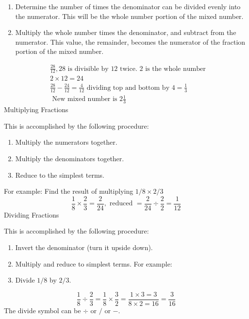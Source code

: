 \documentclass[10pt]{article}
\begin{document}
\begin{enumerate}
  \item Determine the number of times the denominator can be divided evenly into the numerator. This will be the whole number portion of the mixed number.

  \item Multiply the whole number times the denominator, and subtract from the numerator. This value, the remainder, becomes the numerator of the fraction portion of the mixed number.

\end{enumerate}
$$
\begin{aligned}
&\frac{28}{12}, 28 \text { is divisible by } 12 \text { twice. } 2 \text { is the whole number } \\
&2 \times 12=24 \\
&\frac{28}{12}-\frac{24}{12}=\frac{4}{12} \text { dividing top and bottom by } 4=\frac{1}{3} \\
&\text { New mixed number is } 2 \frac{1}{3}
\end{aligned}
$$
Multiplying Fractions

This is accomplished by the following procedure:

\begin{enumerate}
  \item Multiply the numerators together.

  \item Multiply the denominators together.

  \item Reduce to the simplest terms.

\end{enumerate}
For example: Find the result of multiplying $1 / 8 \times 2 / 3$
$$
\frac{1}{8} \times \frac{2}{3}=\frac{2}{24}, \text { reduced }=\frac{2}{24} \div \frac{2}{2}=\frac{1}{12}
$$
Dividing Fractions

This is accomplished by the following procedure:

\begin{enumerate}
  \item Invert the denominator (turn it upside down).

  \item Multiply and reduce to simplest terms. For example:

  \item Divide $1 / 8$ by $2 / 3$.

\end{enumerate}
$$
\frac{1}{8} \div \frac{2}{3}=\frac{1}{8} \times \frac{3}{2}=\frac{1 \times 3=3}{8 \times 2=16}=\frac{3}{16}
$$
The divide symbol can be $\div$ or $/$ or $-$.
\end{document}
